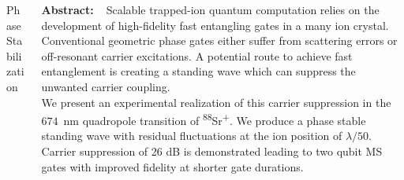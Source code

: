 \documentclass[final]{beamer}
\begin{document}
\begin{frame}{}
\begin{center}
\begin{columns}[t]
\begin{column}{0.49\textwidth}
\begin{alertblock}{Phase Stabilization}
    \end{alertblock}

  \end{column}
  \begin{column}{0.49\textwidth}

    \vspace{-1em}
    \begin{block}{}
    \Large \textbf{Abstract:~~}\large Scalable trapped-ion quantum computation relies on the development of
    high-fidelity fast entangling gates in a many ion
    crystal. Conventional geometric phase gates either suffer from
    scattering errors or off-resonant carrier excitations. A potential
    route to achieve fast entanglement is creating a standing wave which
    can suppress the unwanted carrier coupling. \\
    We present an experimental realization of this carrier suppression
    in the~$674$~nm quadropole transition of
    \textsuperscript{88}Sr\textsuperscript{+}. We produce a phase
    stable standing wave with residual fluctuations at the ion
    position of $\lambda/50$. Carrier suppression of 26 dB is
    demonstrated leading to two qubit MS gates with improved fidelity at shorter
    gate durations.\\
    \end{block}
    \vspace{1em}


\end{column}
\end{columns}
\end{center}
\end{frame}
\end{document}
